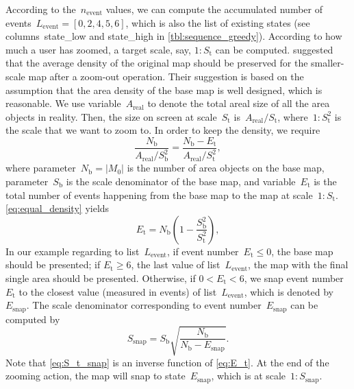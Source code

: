 \documentclass[ijgi,article,submit,moreauthors,pdftex]{Definitions/mdpi}
\begin{document}
According to the~$n_\mathrm{event}$ values,
we can compute the accumulated number of events~$L_\mathrm{event} = 
[0, 2, 4, 5, 6]$,
which is also the list of existing states
(see columns~state\_low and state\_high in \tbl\ref{tbl:sequence_greedy}).
According to how much a user has zoomed,
a target scale, say, $1:S_\mathrm{t}$ can be computed.
\citet{Huang2016Webmap} suggested that 
the average density of the original map should be preserved 
for the smaller-scale map after a zoom-out operation.
Their suggestion is based on the assumption that 
the area density of the base map is well designed, which is reasonable.
We use variable~$A_\mathrm{real}$ to denote the total areal size of 
all the area objects in reality.
Then, the size on screen at scale~$S_\mathrm{t}$ 
is~$A_\mathrm{real} \big/ S_\mathrm{t}$,
where~$1:S^2_\mathrm{t}$ is the scale that we want to zoom to.
In order to keep the density, we require
\begin{equation}
\label{eq:equal_density}
\frac{N_\mathrm{b}}{A_\mathrm{real} \big/ S^2_\mathrm{b}} =
\frac{N_\mathrm{b}-E_\mathrm{t}}{A_\mathrm{real} \big/ S^2_\mathrm{t}},
\end{equation}
where parameter~$N_\mathrm{b} = |M_0|$ is the number of area objects on the base map,
parameter~$S_\mathrm{b}$ is the scale denominator of the base map,
and variable~$E_\mathrm{t}$ is the total number of events 
happening from the base map to the map at scale~$1:S_\mathrm{t}$.
\eq\ref{eq:equal_density} yields
\begin{equation}
\label{eq:E_t}
E_\mathrm{t} = N_\mathrm{b} \left(1-\frac{S^2_\mathrm{b}}{S^2_\mathrm{t}}\right),
\end{equation}
In our example regarding to list~$L_\mathrm{event}$,
if event number~$E_\mathrm{t} \le 0$, the base map should be presented;
if $E_\mathrm{t} \ge 6$, the last value of list~$L_\mathrm{event}$,
the map with the final single area should be presented.
Otherwise, if $0<E_\mathrm{t} < 6$, we snap event number~$E_\mathrm{t}$ 
to the closest value (measured in events) of list~$L_\mathrm{event}$,
which is denoted by~$E_\mathrm{snap}$.
The scale denominator corresponding to event number~$E_\mathrm{snap}$
can be computed by 
\begin{equation}
\label{eq:S_t_snap}
S_\mathrm{snap} = S_\mathrm{b} \sqrt{\frac{N_\mathrm{b}}{N_\mathrm{b}-E_\mathrm{snap}}}.
\end{equation}
Note that \eq\ref{eq:S_t_snap} is an inverse function of \eq\ref{eq:E_t}.
At the end of the zooming action, 
the map will snap to state~$E_\mathrm{snap}$,
which is at scale~$1:S_\mathrm{snap}$.
\end{document}
